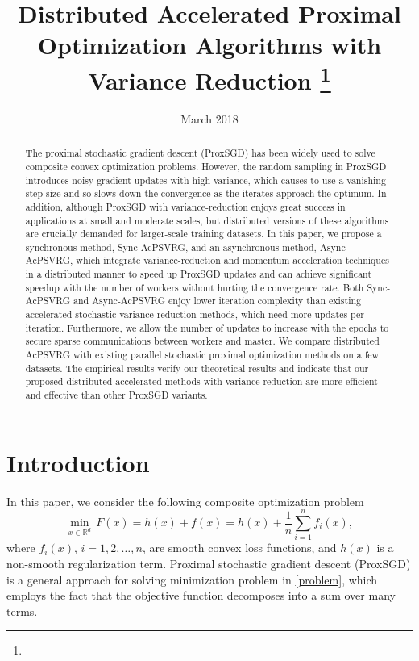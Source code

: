 \documentclass{article}
\date{March 2018}
\newcommand*{\R}{\mathbb{R}}
\theoremstyle{definition}
\theoremstyle{remark}
\begin{document}
\title{Distributed Accelerated Proximal Optimization Algorithms with Variance Reduction
\thanks{}
}
\maketitle

\begin{abstract}
    The proximal stochastic gradient descent (ProxSGD) has been widely used to solve composite convex optimization problems. However, the random sampling in ProxSGD introduces noisy gradient updates with high variance, which causes to use a vanishing step size and so slows down the convergence as the iterates approach the optimum.  In addition, although ProxSGD with variance-reduction enjoys great success in applications at small and moderate scales, but distributed versions of these algorithms are crucially demanded for larger-scale training datasets. In this paper, we propose a synchronous method, Sync-AcPSVRG, and an asynchronous method, Async-AcPSVRG, which integrate variance-reduction and momentum acceleration techniques in a distributed manner to speed up  ProxSGD updates and can achieve significant speedup with the number of workers without hurting the convergence rate. Both Sync-AcPSVRG and Async-AcPSVRG enjoy lower iteration  complexity than existing  accelerated  stochastic  variance  reduction  methods, which need more updates per iteration. Furthermore, we allow the number of updates to increase with the epochs to secure sparse communications between workers and master. We compare distributed AcPSVRG with existing parallel stochastic proximal optimization methods on a few datasets. The empirical results verify our theoretical results and indicate that our proposed distributed accelerated methods with variance reduction are more efficient and effective  than other ProxSGD variants.
\end{abstract}


\section{Introduction}

In this paper, we consider the following composite optimization problem 
\begin{equation}\label{problem}
    \min_{x\in\R^d}\,F(x) = h(x) + f(x)= h(x) + \frac{1}{n} \sum_{i=1}^n f_i(x),
\end{equation}
where $f_i(x)$, $i=1,2,\ldots,n$, are smooth convex loss functions, and $h(x)$ is a non-smooth regularization term. Proximal stochastic gradient descent (ProxSGD) \cite{Nemirovski2009} is a general approach for solving minimization problem in \eqref{problem}, which employs the fact that the objective function decomposes into a sum over many terms. 
\end{document}
